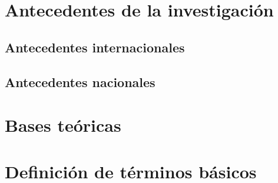 
\section{Antecedentes de la investigación}
\subsection{Antecedentes internacionales}

\subsection{Antecedentes nacionales}

\section{Bases teóricas}
%
%

\section{Definición de términos básicos}
